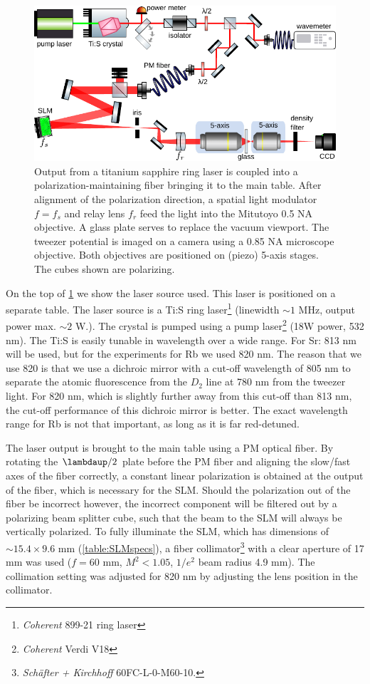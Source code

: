 \begin{figure}
    \centering
    \includegraphics[width=0.95\linewidth]{figures/TiSandSLM.pdf}
    \caption{Output from a titanium sapphire ring laser is coupled into a polarization-maintaining fiber bringing it to the main table. 
    After alignment of the polarization direction, a spatial light modulator $f=f_s$ and relay lens $f_r$ feed the light into the Mitutoyo 0.5 NA objective.
    A glass plate serves to replace the vacuum viewport.
    The tweezer potential is imaged on a camera using a 0.85 NA microscope objective.
    Both objectives are positioned on (piezo) 5-axis stages.
    The cubes shown are polarizing.}
    \label{fig:TiSandSLMsetup}
\end{figure}
On the top of \cref{fig:TiSandSLMsetup} we show the laser source used.
This laser is positioned on a separate table. 
The laser source is a \ac{Ti:S} ring laser\footnote{\textit{Coherent} 899-21 ring laser} (linewidth $\sim 1$ MHz, output power max. $\sim 2$ W.). 
The crystal is pumped using a pump laser\footnote{\textit{Coherent} Verdi V18} (18W power, 532 nm).
The \ac{Ti:S} is easily tunable in wavelength over a wide range. For Sr: 813 nm will be used, but for the experiments for Rb we used 820 nm. 
The reason that we use 820 is that we use a dichroic mirror with a cut-off wavelength of 805 nm to separate the atomic fluorescence from the $D_2$ line at 780 nm from the tweezer light. 
For 820 nm, which is slightly further away from this cut-off than 813 nm, the cut-off performance of this dichroic mirror is better.
The exact wavelength range for Rb is not that important, as long as it is far red-detuned.

The laser output is brought to the main table using a \ac{PM} optical fiber.
By rotating the $\lambdaup/2$ plate before the PM fiber and aligning the slow/fast axes of the fiber correctly, a constant linear polarization is obtained at the output of the fiber, which is necessary for the \ac{SLM}.
Should the polarization out of the fiber be incorrect however, the incorrect component will be filtered out by a polarizing beam splitter cube, such that the beam to the SLM will always be vertically polarized.
To fully illuminate the SLM, which has dimensions of $\sim 15.4 \times 9.6$ mm (\cref{table:SLMspecs}), a fiber collimator\footnote{\textit{Schäfter + Kirchhoff} 60FC-L-0-M60-10.} with a clear aperture of 17 mm was used ($f=60$ mm, $M^2 < 1.05$, $1/e^2$ beam radius 4.9 mm).
The collimation setting was adjusted for 820 nm by adjusting the lens position in the collimator.

